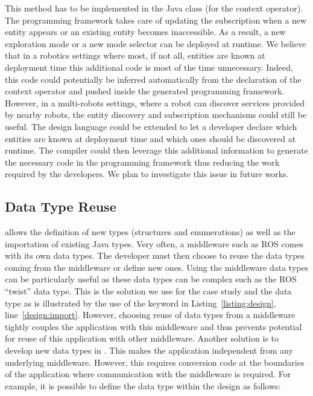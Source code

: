 This method has to be implemented in the  Java class (for
the  context operator). The programming framework takes
care of updating the subscription when a new entity appears or an
existing entity becomes inaccessible. As a result, a new exploration
mode or a new mode selector can be deployed at runtime. We believe
that in a robotics settings where most, if not all, entities are known
at deployment time this additional code is most of the time
unnecessary. Indeed, this code could potentially be inferred
automatically from the declaration of the  context operator
and pushed inside the generated programming framework. However, in a
multi-robots settings, where a robot can discover services provided by
nearby robots, the \diaspec{} entity discovery and subscription
mechanisms could still be useful. The \diaspec{} design language could
be extended to let a developer declare which entities are known at
deployment time and which ones should be discovered at runtime. The
compiler could then leverage this additional information to generate
the necessary code in the programming framework thus reducing the work
required by the developers. We plan to investigate this issue in
future works.

\subsection{Data Type Reuse}

\diaspec{} allows the definition of new types (structures and
enumerations) as well as the importation of existing Java types. Very
often, a middleware such as ROS comes with its own data types. The
developer must then choose to reuse the data types coming from the
middleware or define new ones. Using the middleware data types can be
particularly useful as these data types can be complex such as the ROS
``twist'' data type. This is the solution we use for the case study
and the  data type as is illustrated by the use of the
 keyword in Listing~\ref{listing:design},
line~\ref{design:import}. However, choosing reuse of data types from a
middleware tightly couples the application with this middleware and
thus prevents potential for reuse of this application with other
middleware. Another solution is to develop new data types in
\diaspec{}. This makes the application independent from any underlying
middleware. However, this requires conversion code at the boundaries
of the application where communication with the middleware is
required. For example, it is possible to define the 
data type within the design as follows:

